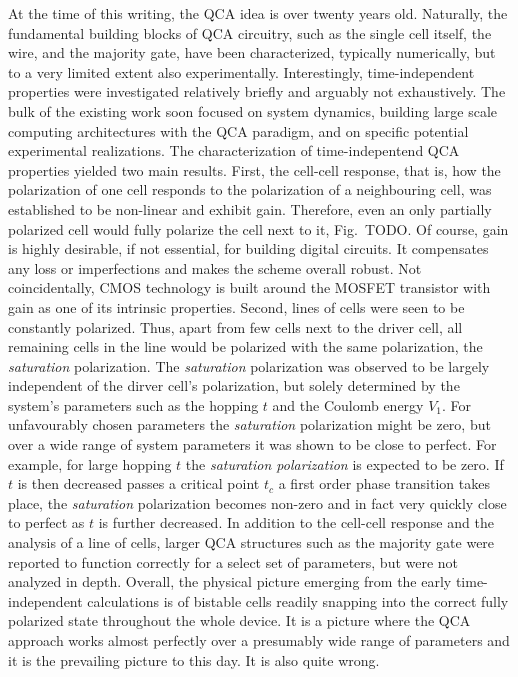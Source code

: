 At the time of this writing, the QCA idea is over twenty years old. Naturally,
the fundamental building blocks of QCA circuitry, such as the single cell
itself, the wire, and the majority gate, have been characterized, typically
numerically, but to a very limited extent also experimentally. Interestingly,
time-independent properties were investigated relatively briefly and arguably
not exhaustively. The bulk of the existing work soon focused on system dynamics,
building large scale computing architectures with the QCA paradigm, and on
specific potential experimental realizations. The characterization of
time-indepentend QCA properties yielded two main results. First, the cell-cell
response, that is, how the polarization of one cell responds to the polarization
of a neighbouring cell, was established to be non-linear and exhibit gain.
Therefore, even an only partially polarized cell would fully polarize the cell
next to it, Fig.~TODO. Of course, gain is highly desirable, if not essential,
for building digital circuits. It compensates any loss or imperfections and
makes the scheme overall robust. Not coincidentally, CMOS technology is built
around the MOSFET transistor with gain as one of its intrinsic properties.
Second, lines of cells were seen to be constantly polarized. Thus, apart from
few cells next to the driver cell, all remaining cells in the line would be
polarized with the same polarization, the \emph{saturation} polarization. The
\emph{saturation} polarization was observed to be largely independent of the
dirver cell's polarization, but solely determined by the system's parameters
such as the hopping $t$ and the Coulomb energy $V_1$. For unfavourably chosen
parameters the \emph{saturation} polarization might be zero, but over a wide
range of system parameters it was shown to be close to perfect. For example, for
large hopping $t$ the \emph{saturation polarization} is expected to be zero. If
$t$ is then decreased passes a critical point $t_c$ a first order phase
transition takes place, the \emph{saturation} polarization becomes non-zero and
in fact very quickly close to perfect as $t$ is further decreased. In addition
to the cell-cell response and the analysis of a line of cells, larger QCA
structures such as the majority gate were reported to function correctly for a
select set of parameters, but were not analyzed in depth. Overall, the physical
picture emerging from the early time-independent calculations is of bistable
cells readily snapping into the correct fully polarized state throughout the
whole device. It is a picture where the QCA approach works almost perfectly over
a presumably wide range of parameters and it is the prevailing picture to this
day. It is also quite wrong.

